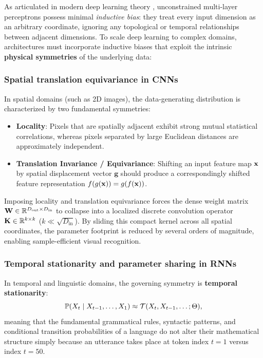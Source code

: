 \documentclass[../../main.tex]{subfiles}
\begin{document}
As articulated in modern deep learning theory \cite{bishop2024deep, goodfellow2016}, unconstrained multi-layer perceptrons possess minimal \emph{inductive bias}: they treat every input dimension as an arbitrary coordinate, ignoring any topological or temporal relationships between adjacent dimensions. To scale deep learning to complex domains, architectures must incorporate inductive biases that exploit the intrinsic \textbf{physical symmetries} of the underlying data:

\subsubsection{Spatial translation equivariance in CNNs}
In spatial domains (such as 2D images), the data-generating distribution is characterized by two fundamental symmetries:
\begin{itemize}
    \item \textbf{Locality}: Pixels that are spatially adjacent exhibit strong mutual statistical correlations, whereas pixels separated by large Euclidean distances are approximately independent.
    \item \textbf{Translation Invariance / Equivariance}: Shifting an input feature map $\mathbf{x}$ by spatial displacement vector $\mathbf{g}$ should produce a correspondingly shifted feature representation $f(g(\mathbf{x})) = g(f(\mathbf{x}))$.
\end{itemize}
Imposing locality and translation equivariance forces the dense weight matrix $\mathbf{W} \in \mathbb{R}^{D_{\text{out}} \times D_{\text{in}}}$ to collapse into a localized discrete convolution operator $\mathbf{K} \in \mathbb{R}^{k \times k}$ ($k \ll \sqrt{D_{\text{in}}}$). By sliding this compact kernel across all spatial coordinates, the parameter footprint is reduced by several orders of magnitude, enabling sample-efficient visual recognition.

\subsubsection{Temporal stationarity and parameter sharing in RNNs}
In temporal and linguistic domains, the governing symmetry is \textbf{temporal stationarity}:
\begin{equation}
\label{eq:temporal_stationarity}
\mathbb{P}(X_t \mid X_{t-1}, \dots, X_1) \approx \mathcal{T}(X_t, X_{t-1}, \dots; \Theta),
\end{equation}
meaning that the fundamental grammatical rules, syntactic patterns, and conditional transition probabilities of a language do not alter their mathematical structure simply because an utterance takes place at token index $t=1$ versus index $t=50$. 
\end{document}
